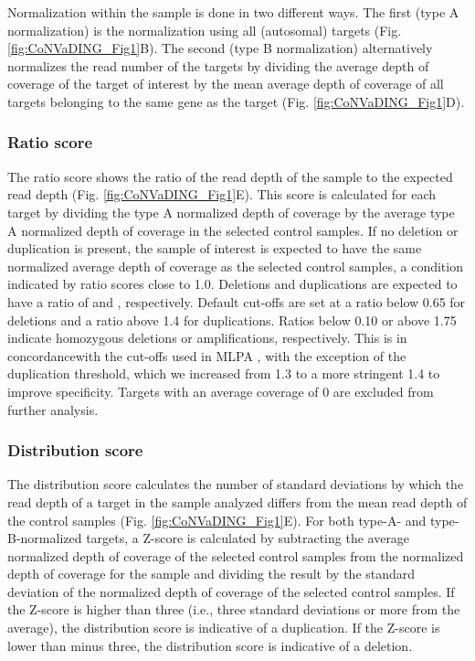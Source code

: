 Normalization within the sample is done in two different ways.
The first (type A normalization) is the normalization using all (autosomal) targets (Fig. \ref{fig:CoNVaDING_Fig1}B). 
The second (type B normalization) alternatively normalizes the read number of the targets by dividing the average depth of coverage of the target of interest by the mean average depth of coverage of all targets belonging to the same gene as the target (Fig. \ref{fig:CoNVaDING_Fig1}D).

\subsubsection{Ratio score}
The ratio score shows the ratio of the read depth of the sample to the expected read depth (Fig. \ref{fig:CoNVaDING_Fig1}E). 
This score is calculated for each target by dividing the type A normalized depth of coverage by the average type A normalized depth of coverage in the selected control samples. 
If no deletion or duplication is present, the sample of interest is expected to have the same normalized average depth of coverage as the selected control samples, a condition indicated by ratio scores close to 1.0. 
Deletions and duplications are expected to have a ratio of  and , respectively. Default cut-offs are set at a ratio below 0.65 for deletions and a ratio above 1.4 for duplications. 
Ratios below 0.10 or above 1.75 indicate homozygous deletions or amplifications, respectively. This is in concordancewith the cut-offs used in MLPA \cite{MRC_Holland_2014}, with the exception of the duplication threshold, which we increased from 1.3 to a more stringent 1.4 to improve specificity. Targets with an average coverage of 0 are excluded from further analysis.


\subsubsection{Distribution score}
The distribution score calculates the number of standard deviations by which the read depth of a target in the sample analyzed differs from the mean read depth of the control samples (Fig. \ref{fig:CoNVaDING_Fig1}E). 
For both type-A- and type-B-normalized targets, a Z-score is calculated by subtracting the average normalized depth of coverage of the selected control samples from the normalized depth of coverage for the sample and dividing the result by the standard deviation of the normalized depth of coverage of the selected control samples.
If the Z-score is higher than three (i.e., three standard deviations or more from the average), the distribution score is indicative of a duplication. 
If the Z-score is lower than minus three, the distribution score is indicative of a deletion. 

